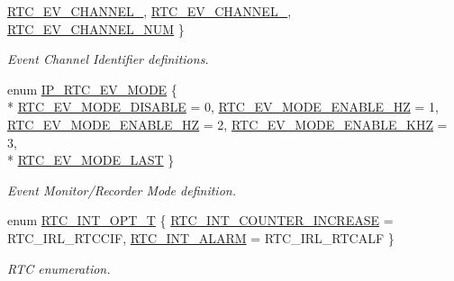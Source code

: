 \begin{DoxyCompactItemize}
\hyperlink{group___r_t_c__18_x_x__43_x_x_ggaac7e8d7c66860037449fdde1bdfb657baeb2b8110c74497dcdbc0f8b6d533fb69}{R\+T\+C\+\_\+\+E\+V\+\_\+\+C\+H\+A\+N\+N\+E\+L\+\_}, 
\hyperlink{group___r_t_c__18_x_x__43_x_x_ggaac7e8d7c66860037449fdde1bdfb657bab5908409b28ddbf4fd51eaf4f85aeb69}{R\+T\+C\+\_\+\+E\+V\+\_\+\+C\+H\+A\+N\+N\+E\+L\+\_}, 
\hyperlink{group___r_t_c__18_x_x__43_x_x_ggaac7e8d7c66860037449fdde1bdfb657bae56aa8110b05663f96d666d4ce378c85}{R\+T\+C\+\_\+\+E\+V\+\_\+\+C\+H\+A\+N\+N\+E\+L\+\_\+\+N\+UM}
 \}\begin{DoxyCompactList}\small\item\em Event Channel Identifier definitions. \end{DoxyCompactList}
\item 
enum \hyperlink{group___r_t_c__18_x_x__43_x_x_gaefde431348a2ce3d7721a63780e9d9ba}{I\+P\+\_\+\+R\+T\+C\+\_\+\+E\+V\+\_\+\+M\+O\+DE} \{ \\*
\hyperlink{group___r_t_c__18_x_x__43_x_x_ggaefde431348a2ce3d7721a63780e9d9baad24f32a223a364f8c097c31ed1ab3138}{R\+T\+C\+\_\+\+E\+V\+\_\+\+M\+O\+D\+E\+\_\+\+D\+I\+S\+A\+B\+LE} = 0, 
\hyperlink{group___r_t_c__18_x_x__43_x_x_ggaefde431348a2ce3d7721a63780e9d9baa3e6fef6c94b90897af317e8ddb84576d}{R\+T\+C\+\_\+\+E\+V\+\_\+\+M\+O\+D\+E\+\_\+\+E\+N\+A\+B\+L\+E\+\_\+HZ} = 1, 
\hyperlink{group___r_t_c__18_x_x__43_x_x_ggaefde431348a2ce3d7721a63780e9d9baac104b566ab32b4d49c505b7f9528cfbb}{R\+T\+C\+\_\+\+E\+V\+\_\+\+M\+O\+D\+E\+\_\+\+E\+N\+A\+B\+L\+E\+\_\+HZ} = 2, 
\hyperlink{group___r_t_c__18_x_x__43_x_x_ggaefde431348a2ce3d7721a63780e9d9baa5a47148b47f17f5c12b30c89f40d573e}{R\+T\+C\+\_\+\+E\+V\+\_\+\+M\+O\+D\+E\+\_\+\+E\+N\+A\+B\+L\+E\+\_\+K\+HZ} = 3, 
\\*
\hyperlink{group___r_t_c__18_x_x__43_x_x_ggaefde431348a2ce3d7721a63780e9d9baab4e33e3423660ab9e4fa677f4cd438a9}{R\+T\+C\+\_\+\+E\+V\+\_\+\+M\+O\+D\+E\+\_\+\+L\+A\+ST}
 \}\begin{DoxyCompactList}\small\item\em Event Monitor/\+Recorder Mode definition. \end{DoxyCompactList}
\item 
enum \hyperlink{group___r_t_c__18_x_x__43_x_x_gacbb4f3e21ac0f90878c95afe11f49161}{R\+T\+C\+\_\+\+I\+N\+T\+\_\+\+O\+P\+T\+\_\+T} \{ \hyperlink{group___r_t_c__18_x_x__43_x_x_ggacbb4f3e21ac0f90878c95afe11f49161a1545f38fd2671cb7521a77e7da3bde4d}{R\+T\+C\+\_\+\+I\+N\+T\+\_\+\+C\+O\+U\+N\+T\+E\+R\+\_\+\+I\+N\+C\+R\+E\+A\+SE} = R\+T\+C\+\_\+\+I\+R\+L\+\_\+\+R\+T\+C\+C\+IF, 
\hyperlink{group___r_t_c__18_x_x__43_x_x_ggacbb4f3e21ac0f90878c95afe11f49161adec1af649886bf5a419d636276ca54a5}{R\+T\+C\+\_\+\+I\+N\+T\+\_\+\+A\+L\+A\+RM} = R\+T\+C\+\_\+\+I\+R\+L\+\_\+\+R\+T\+C\+A\+LF
 \}\begin{DoxyCompactList}\small\item\em R\+TC enumeration. \end{DoxyCompactList}
\end{DoxyCompactItemize}
